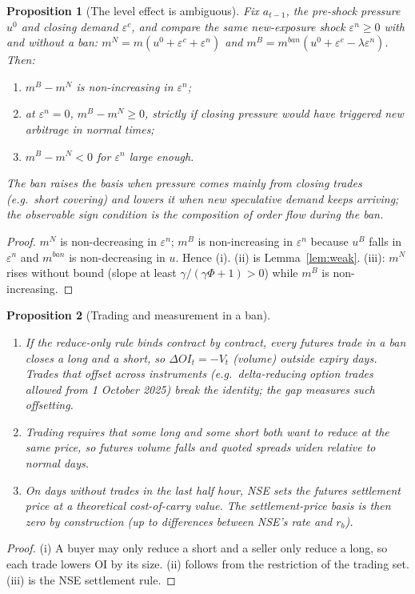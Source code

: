 \documentclass[11pt,a4paper]{article}
\theoremstyle{plain}
\newtheorem{proposition}{Proposition}
\theoremstyle{definition}
\theoremstyle{remark}
\begin{document}
\begin{proposition}[The level effect is ambiguous]\label{prop:level}
Fix $a_{t-1}$, the pre-shock pressure $u^0$ and closing demand $\varepsilon^c$, and compare the same new-exposure shock
$\varepsilon^n\ge0$ with and without a ban: $m^N=m(u^0+\varepsilon^c+\varepsilon^n)$ and
$m^B=m^{ban}(u^0+\varepsilon^c-\lambda\varepsilon^n)$. Then:
\begin{enumerate}[label=(\roman*),leftmargin=1.8em,itemsep=1pt]
\item $m^B-m^N$ is non-increasing in $\varepsilon^n$;
\item at $\varepsilon^n=0$, $m^B-m^N\ge0$, strictly if closing pressure would have triggered new arbitrage in normal times;
\item $m^B-m^N<0$ for $\varepsilon^n$ large enough.
\end{enumerate}
The ban \emph{raises} the basis when pressure comes mainly from closing trades (e.g.\ short covering) and \emph{lowers} it
when new speculative demand keeps arriving; the observable sign condition is the composition of order flow during the ban.
\end{proposition}
\begin{proof}
$m^N$ is non-decreasing in $\varepsilon^n$; $m^B$ is non-increasing in $\varepsilon^n$ because $u^B$ falls in $\varepsilon^n$
and $m^{ban}$ is non-decreasing in $u$. Hence (i). (ii) is Lemma~\ref{lem:weak}. (iii): $m^N$ rises without bound (slope
at least $\gamma/(\gamma\Phi+1)>0$) while $m^B$ is non-increasing.
\end{proof}

\begin{proposition}[Trading and measurement in a ban]\label{prop:trade}
\begin{enumerate}[label=(\roman*),leftmargin=1.8em,itemsep=1pt]
\item If the reduce-only rule binds contract by contract, every futures trade in a ban closes a long and a short, so
$\Delta OI_t=-V_t$ (volume) outside expiry days. Trades that offset across instruments (e.g.\ delta-reducing option trades
allowed from 1 October 2025) break the identity; the gap measures such offsetting.
\item Trading requires that some long and some short both want to reduce at the same price, so futures volume falls
and quoted spreads widen relative to normal days.
\item On days without trades in the last half hour, NSE sets the futures settlement price at a theoretical cost-of-carry
value. The settlement-price basis is then zero by construction (up to differences between NSE's rate and $r_b$).
\end{enumerate}
\end{proposition}
\begin{proof}
(i) A buyer may only reduce a short and a seller only reduce a long, so each trade lowers OI by its size. (ii) follows from
the restriction of the trading set. (iii) is the NSE settlement rule.
\end{proof}
\end{document}
